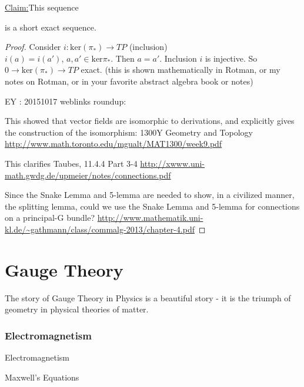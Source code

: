 \documentclass[10pt]{amsart}
\newenvironment{claim}[1]{\par\noindent\underline{Claim:}\space#1}{}
\begin{document}
\begin{multicols*}{2}
\begin{claim}
This sequence
is a short exact sequence.
\end{claim}

\begin{proof}
  Consider $i : \text{ker}(\pi_*) \to TP$ (inclusion) \\
$i(a) = i(a')$, $a, a' \in \text{ker}\pi_*$.  Then $a=a'$.  Inclusion $i$ is injective.  So $0 \to \text{ker}(\pi_*) \to TP$ exact.  (this is shown mathematically in Rotman, or my notes on Rotman, or in your favorite abstract algebra book or notes) 

EY : 20151017 weblinks roundup:

This showed that vector fields are isomorphic to derivations, and explicitly gives the construction of the isomorphism: 1300Y Geometry and Topology \url{http://www.math.toronto.edu/mgualt/MAT1300/week9.pdf}

This clarifies Taubes, 11.4.4 Part 3-4 \url{http://xwww.uni-math.gwdg.de/upmeier/notes/connections.pdf}

Since the Snake Lemma and 5-lemma are needed to show, in a civilized manner, the splitting lemma, could we use the Snake Lemma and 5-lemma for connections on a principal-G bundle? \url{http://www.mathematik.uni-kl.de/~gathmann/class/commalg-2013/chapter-4.pdf}

\end{proof}

\part{Gauge Theory}

The story of Gauge Theory in Physics is a beautiful story - it is the triumph of geometry in physical theories of matter.  

\section{Electromagnetism}

\begin{description}
\item Electromagnetism
\item Maxwell's Equations
\end{description}


\end{multicols*}
\end{document}
